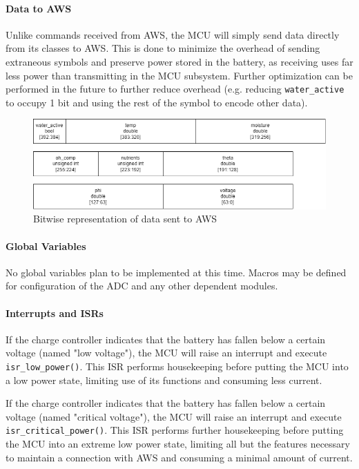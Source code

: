\paragraph{Data to AWS}
Unlike commands received from AWS, the MCU will simply send data directly
from its classes to AWS. This is done to minimize the overhead of sending
extraneous symbols and preserve power stored in the battery, as receiving
uses far less power than transmitting in the MCU subsystem. Further
optimization can be performed in the future to further reduce overhead
(e.g. reducing \texttt{water\_active} to occupy 1 bit and using the rest of
the symbol to encode other data).
\begin{figure}[H]
    \caption{Bitwise representation of data sent to AWS}
    \label{toweb_encoding}
    \centering
    \includegraphics[width=\textwidth]{images/toweb_encoding.png}
\end{figure}

\paragraph{Global Variables}
No global variables plan to be implemented at this time. Macros may be
defined for configuration of the ADC and any other dependent modules.

\paragraph{Interrupts and ISRs}
If the charge controller indicates that the battery has fallen below a
certain voltage (named "low voltage"), the MCU will raise an interrupt and
execute \texttt{isr\_low\_power()}. This ISR performs housekeeping before
putting the MCU into a low power state, limiting use of its functions and consuming less current.

If the charge controller indicates that the battery has fallen below a
certain voltage (named "critical voltage"), the MCU will raise an interrupt
and execute \texttt{isr\_critical\_power()}. This ISR performs further 
housekeeping before putting the MCU into an extreme low power state,
limiting all but the features necessary to maintain a connection with AWS and consuming a minimal amount of current.

